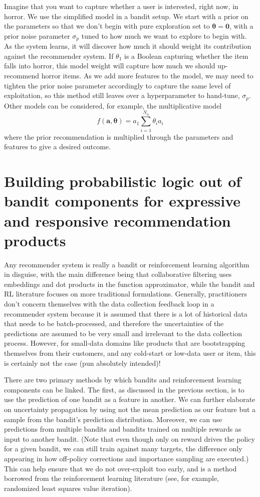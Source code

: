 \documentclass[manuscript, nonacm, screen=true]{acmart}
\begin{document}
Imagine that you want to capture whether a user is interested, right now, in horror. We use the simplified model in a bandit setup. We start with a prior on the parameters so that we don't begin with pure exploration set to $\boldsymbol{\theta}=\mathbf{0}$, with a prior noise parameter $\sigma_p$ tuned to how much we want to explore to begin with. As the system learns, it will discover how much it should weight its contribution against the recommender system. If $\theta_1$ is a Boolean capturing whether the item falls into horror, this model weight will capture how much we should up-recommend horror items. As we add more features to the model, we may need to tighten the prior noise parameter accordingly to capture the same level of exploitation, so this method still leaves over a hyperparameter to hand-tune, $\sigma_p$. Other models can be considered, for example, the multiplicative model
\begin{equation}
    f(\mathbf{a},\boldsymbol{\theta}) =  a_1  \sum_{i=1}^{N_a}\theta_i a_i
\end{equation}where the prior recommendation is multiplied through the parameters and features to give a desired outcome.

\section{Building probabilistic logic out of bandit components for expressive and responsive recommendation products}

Any recommender system is really a bandit or reinforcement learning algorithm in disguise, with the main difference being that collaborative filtering uses embeddings and dot products in the function approximator, while the bandit and RL literature focuses on more traditional formulations. Generally, practitioners don't concern themselves with the data collection feedback loop in a recommender system because it is assumed that there is a lot of historical data that needs to be batch-processed, and therefore the uncertainties of the predictions are assumed to be very small and irrelevant to the data collection process. However, for small-data domains like products that are bootstrapping themselves from their customers, and any cold-start or low-data user or item, this is certainly not the case (pun absolutely intended)!

There are two primary methods by which bandits and reinforcement learning components can be linked. The first, as discussed in the previous section, is to use the prediction of one bandit as a feature in another. We can further elaborate on uncertainty propagation by using not the mean prediction as our feature but a sample from the bandit's prediction distribution. Moreover, we can use predictions from multiple bandits and bandits trained on multiple rewards as input to another bandit. (Note that even though only on reward drives the policy for a given bandit, we can still train against many targets, the difference only appearing in how off-policy corrections and importance sampling are executed.) This can help ensure that we do not over-exploit too early, and is a method borrowed from the reinforcement learning literature (see, for example, randomized least squares value iteration\cite{RLSVI}).
\end{document}
